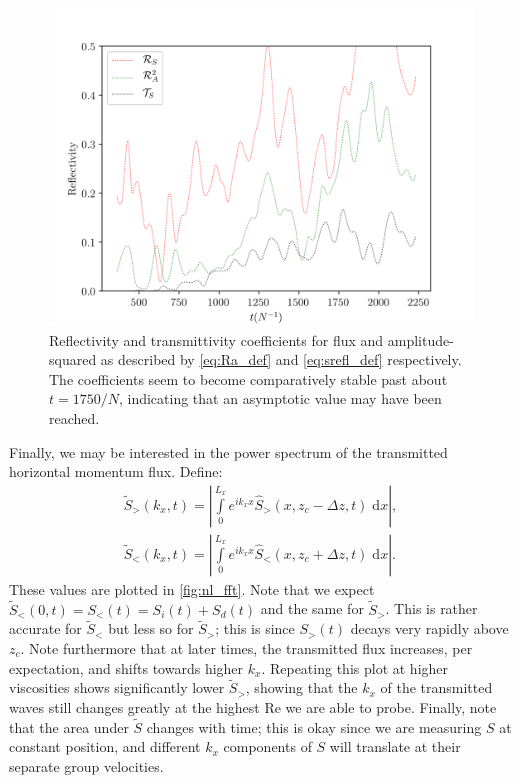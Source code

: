 \documentclass[
        fleqn,
        usenatbib,
    ]{mnras}
\newcommand*{\abs}[1]{\left|#1\right|}
\begin{document}
\begin{figure}[t]
    \centering
    \includegraphics[width=\columnwidth]{plots/nl_f_refl.png}
    \caption{Reflectivity and transmittivity coefficients for flux and
    amplitude-squared as described by \autoref{eq:Ra_def} and
    \autoref{eq:srefl_def} respectively. The coefficients seem to become
    comparatively stable past about $t = 1750/N$, indicating that an asymptotic
    value may have been reached.}\label{fig:nl_f_refl}
\end{figure}

Finally, we may be interested in the power spectrum of the transmitted
horizontal momentum flux. Define:
\begin{align}
    \tilde{S}_>(k_x, t) = \abs{
        \int\limits_0^{L_x} e^{ik_xx}\hat{S}_>(x, z_c - \Delta z, t)\;\mathrm{d}x}
            \label{eq:sfft_above},\\
    \tilde{S}_<(k_x, t) = \abs{
        \int\limits_0^{L_x} e^{ik_xx}\hat{S}_<(x, z_c + \Delta z, t)\;\mathrm{d}x}.
            \label{eq:sfft_below}
\end{align}
These values are plotted in \autoref{fig:nl_fft}. Note that we expect
$\tilde{S}_<(0, t) = S_<(t) = S_i(t) + S_d(t)$ and the same for $\tilde{S}_>$.
This is rather accurate for $\tilde{S}_<$ but less so for $\tilde{S}_>$; this is
since $S_>(t)$ decays very rapidly above $z_c$. Note furthermore that at later
times, the transmitted flux increases, per expectation, and shifts towards
higher $k_x$. Repeating this plot at higher viscosities shows significantly
lower $\tilde{S}_>$, showing that the $k_x$ of the transmitted waves still
changes greatly at the highest $\mathrm{Re}$ we are able to probe. Finally, note
that the area under $\tilde{S}$ changes with time; this is okay since we are
measuring $S$ at constant position, and different $k_x$ components of $S$ will
translate at their separate group velocities.
\end{document}
